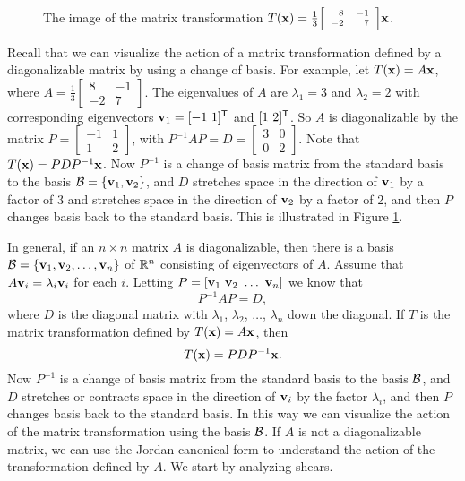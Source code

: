 \label{sec:mtx_jordan_geom}

\begin{figure}[ht]
\begin{center}
\end{center}
\caption[The image of the matrix transformation.]{The image of the matrix transformation  $T(\mathbf{x}) =  \frac{1}{3} {\scriptsize \left[ \begin{array}{rr} 8&-1\\-2&7 \end{array} \right] }\mathbf{x}$.}
\label{F:JCF_geometry_1}
\end{figure}

Recall that we can visualize the action of a matrix transformation defined by a diagonalizable matrix by using a change of basis. For example, let $T(\mathbf{x}) = A\mathbf{x}$, where $A = \frac{1}{3}\left[ \begin{array}{rr} 8&-1\\-2&7 \end{array} \right]$. The eigenvalues of $A$ are $\lambda_1 = 3$ and $\lambda_2 = 2$ with corresponding eigenvectors $\vv_1 = [-1 \ 1]^{\tr}$ and $[1 \ 2]^{\mathsf{T}}$. So $A$ is diagonalizable by the matrix $P = \left[ \begin{array}{rc} -1&1\\1&2 \end{array} \right]$, with $P^{-1}AP = D = \left[ \begin{array}{cc} 3&0\\0&2 \end{array} \right]$. Note that $T(\mathbf{x}) = PDP^{-1} \mathbf{x}$. Now $P^{-1}$ is a change of basis matrix from the standard basis to the basis $\mathcal{B} = \{\mathbf{v}_1, \mathbf{v}_2\}$, and $D$ stretches space in the direction of $\mathbf{v}_1$ by a factor of 3 and stretches space in the direction of $\mathbf{v}_2$ by a factor of 2, and then $P$ changes basis back to the standard basis. This is illustrated in Figure \ref{F:JCF_geometry_1}.

In general, if an $n \times n$ matrix $A$ is diagonalizable, then there is a basis $\mathcal{B} = \{\mathbf{v}_1, \mathbf{v}_2, \ldots, \mathbf{v}_n\}$ of $\mathbb{R}^n$ consisting of eigenvectors of $A$. Assume that $A \mathbf{v}_i = \lambda_i \mathbf{v}_i$ for each $i$. Letting $P = [\vv_1 \ \vv_2 \ \ldots \ \vv_n]$ we know that 
\[P^{-1}AP = D,\]
where $D$ is the diagonal matrix with $\lambda_1$, $\lambda_2$, $\ldots$, $\lambda_n$ down the diagonal. If $T$ is the matrix transformation defined by $T(\mathbf{x}) = A\mathbf{x}$, then 
\[T(\mathbf{x}) = PDP^{-1} \mathbf{x}.\]
Now $P^{-1}$ is a change of basis matrix from the standard basis to the basis $\mathcal{B}$, and $D$ stretches or contracts space in the direction of $\mathbf{v}_i$ by the factor $\lambda_i$, and then $P$ changes basis back to the standard basis. In this way we can visualize the action of the matrix transformation using the basis $\mathcal{B}$. If $A$ is not a diagonalizable matrix, we can use the Jordan canonical form to understand the action of the transformation defined by $A$. We start by analyzing shears.


